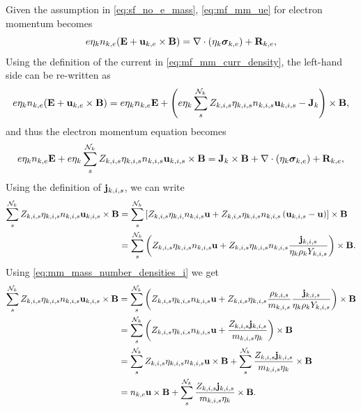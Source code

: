 \documentclass[a4paper,11pt]{report}
\begin{document}
Given the assumption in \cref{eq:sf_no_e_mass}, \cref{eq:mf_mm_ue} for electron momentum becomes
\begin{equation*}
    e \eta_k n_{k,e} ( \mathbf{E} + \mathbf{u}_{k,e} \times \mathbf{B} ) = \nabla \cdot \left( \eta_k \bm \sigma_{k,e} \right) + \mathbf{R}_{k,e},
\end{equation*}
Using the definition of the current in \cref{eq:mf_mm_curr_density}, the left-hand side can be re-written as
\begin{equation*}
    e \eta_k n_{k,e} ( \mathbf{E} + \mathbf{u}_{k,e} \times \mathbf{B} ) = e \eta_k n_{k,e} \mathbf{E} + \left( e \eta_k \sum_s^{\mathcal{N}_k} Z_{k,i,s} \eta_{k,i,s} n_{k,i,s} \mathbf{u}_{k,i,s} - \mathbf{J}_k \right) \times \mathbf{B},
\end{equation*}
and thus the electron momentum equation becomes
\begin{equation*}
    e \eta_k n_{k,e} \mathbf{E} + e \eta_k \sum_s^{\mathcal{N}_k} Z_{k,i,s} \eta_{k,i,s} n_{k,i,s} \mathbf{u}_{k,i,s} \times \mathbf{B} = \mathbf{J}_k \times \mathbf{B} + \nabla \cdot \left( \eta_k \bm \sigma_{k,e} \right) + \mathbf{R}_{k,e},
\end{equation*}
Using the definition of $\mathbf{j}_{k,i,s}$, we can write
\begin{align*}
    \sum_s^{\mathcal{N}_k} Z_{k,i,s} \eta_{k,i,s} n_{k,i,s} \mathbf{u}_{k,i,s} \times \mathbf{B} &= \sum_s^{\mathcal{N}_k} \left[ Z_{k,i,s} \eta_{k,i,} n_{k,i,s} \mathbf{u} + Z_{k,i,s} \eta_{k,i,s} n_{k,i,s} \left( \mathbf{u}_{k,i,s} - \mathbf{u} \right) \right] \times \mathbf{B} \\
    &= \sum_s^{\mathcal{N}_k} \left( Z_{k,i,s} \eta_{k,i,s} n_{k,i,s} \mathbf{u} + Z_{k,i,s} \eta_{k,i,s} n_{k,i,s} \frac{\mathbf{j}_{k,i,s}}{\eta_k \rho_k Y_{k,i,s}} \right) \times \mathbf{B}.
\end{align*}
Using \cref{eq:mm_mass_number_densities_i} we get
\begin{align*}
    \sum_s^{\mathcal{N}_k} Z_{k,i,s} \eta_{k,i,s} n_{k,i,s} \mathbf{u}_{k,i,s} \times \mathbf{B} &= \sum_s^{\mathcal{N}_k} \left( Z_{k,i,s} \eta_{k,i,s} n_{k,i,s} \mathbf{u} +  Z_{k,i,s} \eta_{k,i,s} \frac{\rho_{k,i,s}}{m_{k,i,s}} \frac{\mathbf{j}_{k,i,s}}{\eta_k \rho_k Y_{k,i,s}} \right) \times \mathbf{B} \\
    &= \sum_s^{\mathcal{N}_k} \left( Z_{k,i,s} \eta_{k,i,s} n_{k,i,s} \mathbf{u} + \frac{Z_{k,i,s} \mathbf{j}_{k,i,s}}{m_{k,i,s} \eta_k} \right) \times \mathbf{B} \\
    &= \sum_s^{\mathcal{N}_k} Z_{k,i,s} \eta_{k,i,s} n_{k,i,s} \mathbf{u} \times \mathbf{B} + \sum_s^{\mathcal{N}_k} \frac{Z_{k,i,s} \mathbf{j}_{k,i,s}}{m_{k,i,s} \eta_k} \times \mathbf{B} \\
    &= n_{k,e} \mathbf{u} \times \mathbf{B} + \sum_s^{\mathcal{N}_k} \frac{Z_{k,i,s} \mathbf{j}_{k,i,s}}{m_{k,i,s} \eta_k} \times \mathbf{B}.
\end{align*}
\end{document}
